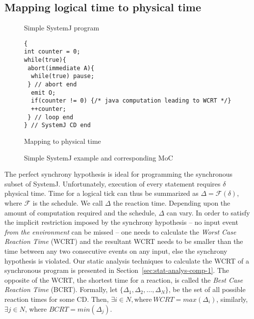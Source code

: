 \subsection{Mapping logical time to physical time}
\label{sec:mapping-logical-time}

\begin{figure}[t!]
\centering
\begin{SubFloat}{\label{fig:2a}Simple SystemJ program}%
\begin{minipage}[b]{1\linewidth}%
		\begin{lstlisting}[style=sysj,morekeywords={abort,await,emit,present,trap,pause,exit,delay,suspend}]
{
int counter = 0;
while(true){
 abort(immediate A){
  while(true) pause; 
 } // abort end
  emit O;
  if(counter != 0) {/* java computation leading to WCRT */}
  ++counter;
 } // loop end
} // SystemJ CD end
\end{lstlisting}%
\end{minipage}%
\end{SubFloat}

\begin{SubFloat}{\label{fig:2c}Mapping to physical time}%
\scalebox{0.68}{}
\end{SubFloat}%
\caption{Simple SystemJ example and corresponding MoC}
\label{fig:2}
\end{figure}

The perfect synchrony hypothesis is ideal for programming the
synchronous subset of SystemJ. Unfortunately, execution of every
statement requires $\delta$ physical time. Time for a logical tick can
thus be summarized as $\Delta = \mathcal{F} (\delta)$, where
$\mathcal{F}$ is the schedule. We call $\Delta$ the reaction
time. Depending upon the amount of computation required and the
schedule, $\Delta$ can vary. In order to satisfy the implicit
restriction imposed by the synchrony hypothesis -- no input event
\textit{from the environment} can be missed -- one needs to calculate
the \textit{Worst Case Reaction Time} (WCRT) and the resultant WCRT
needs to be smaller than the time between any two consecutive events on
any input, else the synchrony hypothesis is violated. Our static
analysis techniques to calculate the WCRT of a synchronous program is
presented in Section~\ref{sec:stat-analys-comp-1}. The opposite of the
WCRT, the shortest time for a reaction, is called the \textit{Best Case
  Reaction Time} (BCRT). Formally, let $\{\Delta_1, \Delta_2,\ldots,
\Delta_N\}$, be the set of all possible reaction times for some
CD. Then, $\exists i \in N, \mathrm{where\ } WCRT= max (\Delta_i)$,
similarly, $\exists j \in N$, where $BCRT = min (\Delta_j)$.


